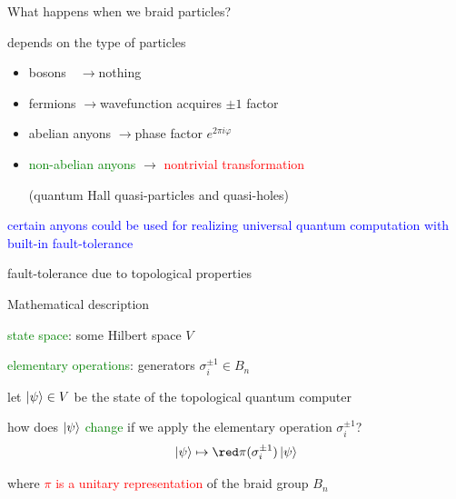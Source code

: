 \documentclass{prosper}
\renewcommand{\>}{\rangle}
\newcommand{\<}{\langle}
\begin{document}

\begin{slide}{What happens when we braid particles?}

depends on the type of particles
\begin{itemize}
\item bosons \quad\,\, $\rightarrow$\quad nothing 

\medskip
\item fermions \quad$\rightarrow$\quad wavefunction acquires $\pm 1$ factor

\medskip 
\item abelian anyons\hspace{1.3cm} $\rightarrow$\quad phase factor $e^{2\pi i\varphi}$

\medskip
\item \textcolor{green}{non-abelian anyons} \quad$\rightarrow$\quad
\textcolor{red}{nontrivial transformation}

\medskip
(quantum Hall quasi-particles and quasi-holes)
\end{itemize}

\medskip
\textcolor{blue}{certain anyons could be used for realizing universal
quantum computation with built-in fault-tolerance} 

\bigskip
fault-tolerance due to topological properties

\end{slide}


\begin{slide}{Mathematical description}

\textcolor{green}{state space}: some Hilbert space $V$

\bigskip
\textcolor{green}{elementary operations}: generators $\sigma_i^{\pm
1}\in B_n$ 

\bigskip

\bigskip
let $\left\vert{\psi}\right\rangle\in V$ be the state of the topological quantum computer

\bigskip 
how does \textcolor{green}{$\left\vert{\psi}\right\rangle$ change} if we apply
the elementary operation $\sigma_i^{\pm 1}$?
\[
\ket{\psi}\mapsto {\red \pi(\sigma_i^{\pm 1})}\ket{\psi}
\]

\medskip
where \textcolor{red}{$\pi$ is a unitary representation} of the braid
group $B_n$
\end{slide}
\end{document}
